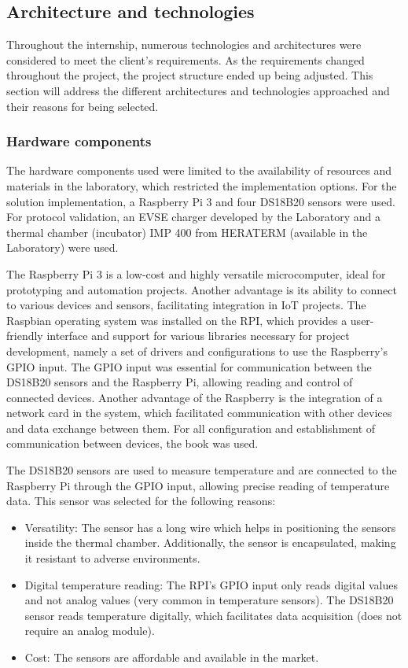 \subsection{Architecture and technologies}

Throughout the internship, numerous technologies and architectures were considered to meet the client's requirements. As the requirements changed throughout the project, the project structure ended up being adjusted. This section will address the different architectures and technologies approached and their reasons for being selected.

\subsubsection{Hardware components}
The hardware components used were limited to the availability of resources and materials in the laboratory, which restricted the implementation options. For the solution implementation, a Raspberry Pi 3 and four DS18B20 sensors were used.
For protocol validation, an EVSE charger developed by the Laboratory and a thermal chamber (incubator) IMP 400 from HERATERM (available in the Laboratory) were used.

The Raspberry Pi 3 is a low-cost and highly versatile microcomputer, ideal for prototyping and automation projects. Another advantage is its ability to connect to various devices and sensors, facilitating integration in IoT projects. The Raspbian operating system was installed on the RPI, which provides a user-friendly interface and support for various libraries necessary for project development, namely a set of drivers and configurations to use the Raspberry's GPIO input. The GPIO input was essential for communication between the DS18B20 sensors and the Raspberry Pi, allowing reading and control of connected devices. Another advantage of the Raspberry is the integration of a network card in the system, which facilitated communication with other devices and data exchange between them. For all configuration and establishment of communication between devices, the book \cite{Molloy_2016} was used.

The DS18B20 sensors are used to measure temperature and are connected to the Raspberry Pi through the GPIO input, allowing precise reading of temperature data. This sensor was selected for the following reasons:
\begin{itemize}
    \item Versatility: The sensor has a long wire which helps in positioning the sensors inside the thermal chamber. Additionally, the sensor is encapsulated, making it resistant to adverse environments.
    \item Digital temperature reading: The RPI's GPIO input only reads digital values and not analog values (very common in temperature sensors). The DS18B20 sensor reads temperature digitally, which facilitates data acquisition (does not require an analog module).
    \item Cost: The sensors are affordable and available in the market.
\end{itemize}

